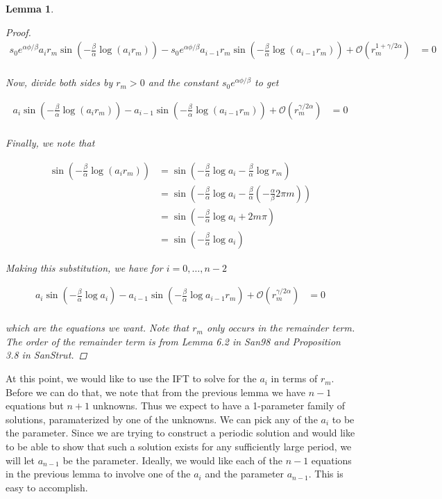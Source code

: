 \documentclass[12pt]{article}
\newtheorem{lemma}{Lemma}
\begin{document}
\begin{lemma}
\begin{proof}
\begin{align}\label{diff2}
s_0 e^{\alpha \phi / \beta } a_i r_m \sin \left( - \frac{\beta}{\alpha} \log (a_i r_m) \right) - s_0 e^{\alpha \phi / \beta } a_{i-1} r_m \sin \left( - \frac{\beta}{\alpha} \log (a_{i-1} r_m) \right) + \mathcal{O}(r_m^{1 + \gamma / 2 \alpha}) &= 0 \\
\end{align}

Now, divide both sides by $r_m > 0$ and the constant $s_0 e^{\alpha \phi / \beta }$ to get

\begin{align}\label{diff2}
a_i \sin \left( - \frac{\beta}{\alpha} \log (a_i r_m) \right) -  a_{i-1} \sin \left( - \frac{\beta}{\alpha} \log (a_{i-1} r_m) \right) + \mathcal{O}(r_m^{\gamma / 2 \alpha}) &= 0 \\
\end{align}

Finally, we note that

\begin{align*}
\sin \left( - \frac{\beta}{\alpha} \log (a_i r_m) \right)&=
\sin \left( - \frac{\beta}{\alpha} \log a_i - \frac{\beta}{\alpha} \log r_m  \right) \\
&= \sin \left( - \frac{\beta}{\alpha} \log a_i -\frac{\beta}{\alpha}\left( -\frac{\alpha}{\beta}2\pi m \right) \right) \\
&= \sin \left( - \frac{\beta}{\alpha} \log a_i + 2 m \pi \right) \\
&= \sin \left( - \frac{\beta}{\alpha} \log a_i \right) 
\end{align*}

Making this substitution, we have for $i = 0, \dots, n-2$

\begin{align}\label{diff3}
a_i \sin \left( - \frac{\beta}{\alpha} \log a_i \right) - a_{i-1} \sin \left( - \frac{\beta}{\alpha} \log a_{i-1} r_m \right) + \mathcal{O}(r_m^{\gamma / 2 \alpha}) &= 0 \\
\end{align}

which are the equations we want. Note that $r_m$ only occurs in the remainder term. The order of the remainder term is from Lemma 6.2 in San98 and Proposition 3.8 in SanStrut.

\end{proof}
\end{lemma}

At this point, we would like to use the IFT to solve for the $a_i$ in terms of $r_m$. Before we can do that, we note that from the previous lemma we have $n-1$ equations but $n+1$ unknowns. Thus we expect to have a 1-parameter family of solutions, paramaterized by one of the unknowns. We can pick any of the $a_i$ to be the parameter. Since we are trying to construct a periodic solution and would like to be able to show that such a solution exists for any sufficiently large period, we will let $a_{n-1}$ be the parameter. Ideally, we would like each of the $n-1$ equations in the previous lemma to involve one of the $a_i$ and the parameter $a_{n-1}$. This is easy to accomplish.
\end{document}
